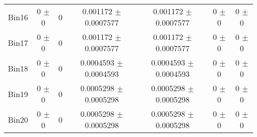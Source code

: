 \begin{tabular}{@{\extracolsep{4pt}}lcccccc@{}}
     Bin16 & 0 $\pm$ 0 & 0 & 0.001172 $\pm$ 0.0007577 & 0.001172 $\pm$ 0.0007577 & 0 $\pm$ 0 & 0 $\pm$ 0 \\ 
     Bin17 & 0 $\pm$ 0 & 0 & 0.001172 $\pm$ 0.0007577 & 0.001172 $\pm$ 0.0007577 & 0 $\pm$ 0 & 0 $\pm$ 0 \\ 
     Bin18 & 0 $\pm$ 0 & 0 & 0.0004593 $\pm$ 0.0004593 & 0.0004593 $\pm$ 0.0004593 & 0 $\pm$ 0 & 0 $\pm$ 0 \\ 
     Bin19 & 0 $\pm$ 0 & 0 & 0.0005298 $\pm$ 0.0005298 & 0.0005298 $\pm$ 0.0005298 & 0 $\pm$ 0 & 0 $\pm$ 0 \\ 
     Bin20 & 0 $\pm$ 0 & 0 & 0.0005298 $\pm$ 0.0005298 & 0.0005298 $\pm$ 0.0005298 & 0 $\pm$ 0 & 0 $\pm$ 0 \\ 
\hline\hline
  \end{tabular}
